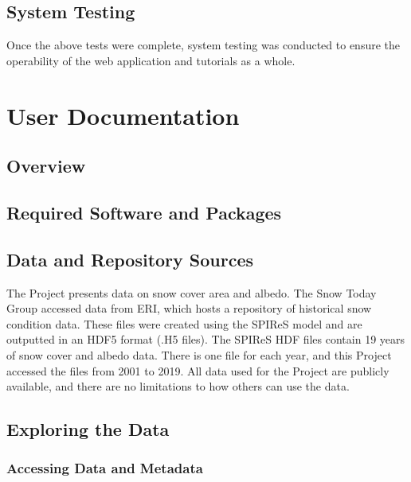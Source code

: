 \documentclass[
]{book}
\begin{document}
\hypertarget{system-testing}{%
\section{System Testing}\label{system-testing}}

Once the above tests were complete, system testing was conducted to ensure the operability of the web application and tutorials as a whole.

\hypertarget{userdoc}{%
\chapter{User Documentation}\label{userdoc}}

\hypertarget{overview}{%
\section{Overview}\label{overview}}

\hypertarget{required-software-and-packages}{%
\section{Required Software and Packages}\label{required-software-and-packages}}

\hypertarget{data-and-repository-sources}{%
\section{Data and Repository Sources}\label{data-and-repository-sources}}

The Project presents data on snow cover area and albedo. The Snow Today Group accessed data from ERI, which hosts a repository of historical snow condition data. These files were created using the SPIReS model and are outputted in an HDF5 format (.H5 files). The SPIReS HDF files contain 19 years of snow cover and albedo data. There is one file for each year, and this Project accessed the files from 2001 to 2019. All data used for the Project are publicly available, and there are no limitations to how others can use the data.

\hypertarget{exploring-the-data}{%
\section{Exploring the Data}\label{exploring-the-data}}

\hypertarget{accessing-data-and-metadata}{%
\subsection{Accessing Data and Metadata}\label{accessing-data-and-metadata}}
\end{document}
